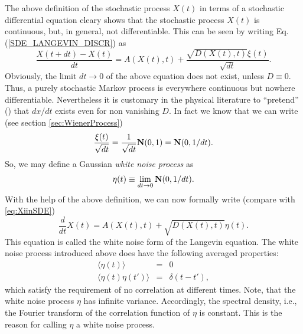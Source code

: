 The above definition of the stochastic process $X(t)$
in terms of a stochastic differential equation  cleary shows that
the stochastic process $X(t)$ is continuous, but, in general, not 
differentiable. This can be seen by writing
Eq. (\ref{SDE_LANGEVIN_DISCR}) as
\begin{equation*}
\label{eq:XiinSDE}
\frac{X(t+dt) - X(t)}{dt} = A(X(t),t) + \frac{\sqrt{D(X(t),t)} \xi(t)}
                                              {\sqrt{dt}}.
\end{equation*}
Obviously, the limit $dt \rightarrow 0$ of the above equation does not
exist, unless $D\equiv 0$. Thus, a purely stochastic Markov process
is everywhere continuous but nowhere differentiable. Nevertheless it is
customary in the physical literature to ``pretend'' (\cite{GILLESPIE})
that $dx/dt$ exists even for
non vanishing $D$. In fact we know that we can write (see section
\ref{sec:WienerProcess})
\begin{equation*}
\frac{\xi(t)}{\sqrt{dt}} = \frac{1}{\sqrt{dt}} {\bf N}(0,1) =
{\bf N}(0,1/dt).
\end{equation*}
So, we may define a Gaussian {\em white noise process} as
\begin{equation*}
\eta(t) \equiv \lim_{dt \rightarrow 0}  {\bf N}(0,1/dt).
\end{equation*}
With the help of the above definition, we can now formally write
(compare with \ref{eq:XiinSDE})
\begin{equation*}
\frac{d}{dt} X(t) = A(X(t),t) + \sqrt{D(X(t),t)} \eta(t).
\end{equation*}
This equation is called the white noise form of the Langevin equation.
The white noise process introduced above does have the following
averaged properties:
\begin{eqnarray*}
\langle \eta(t) \rangle &=& 0 \\
\langle \eta(t) \eta(t') \rangle &=& \delta(t-t'),
\end{eqnarray*}
which satisfy the requirement of no correlation at different
times. Note, that the white noise process  $\eta$ has
infinite variance. Accordingly, the spectral density, i.e.,
the Fourier transform of the correlation function of $\eta$ is 
constant. This is the reason for calling $\eta$ a white noise
process.

